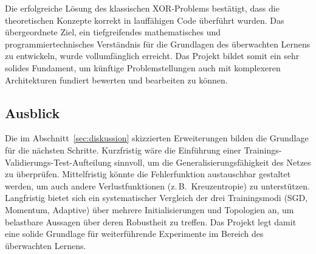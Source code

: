 Die erfolgreiche Lösung des klassischen XOR-Problems bestätigt, dass die theoretischen Konzepte korrekt in lauffähigen Code überführt wurden. Das übergeordnete Ziel, ein tiefgreifendes mathematisches und programmiertechnisches Verständnis für die Grundlagen des überwachten Lernens zu entwickeln, wurde vollumfänglich erreicht. Das Projekt bildet somit ein sehr solides Fundament, um künftige Problemstellungen auch mit komplexeren Architekturen fundiert bewerten und bearbeiten zu können.

\subsection{Ausblick}
Die im Abschnitt~\ref{sec:diskussion} skizzierten Erweiterungen bilden die Grundlage für die nächsten Schritte. Kurzfristig wäre die Einführung einer Trainings-Validierungs-Test-Aufteilung sinnvoll, um die Generalisierungsfähigkeit des Netzes zu überprüfen. Mittelfristig könnte die Fehlerfunktion austauschbar gestaltet werden, um auch andere Verlustfunktionen (z.\,B.\ Kreuzentropie) zu unterstützen. Langfristig bietet sich ein systematischer Vergleich der drei Trainingsmodi (SGD, Momentum, Adaptive) über mehrere Initialisierungen und Topologien an, um belastbare Aussagen über deren Robustheit zu treffen. Das Projekt legt damit eine solide Grundlage für weiterführende Experimente im Bereich des überwachten Lernens.
